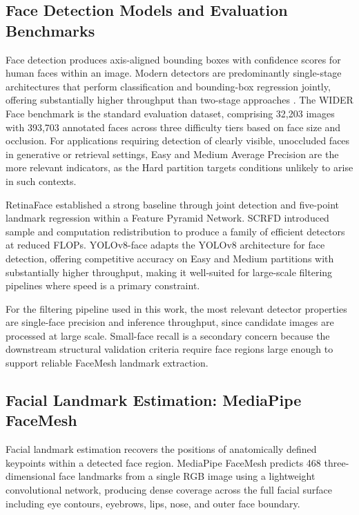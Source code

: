 \subsection{Face Detection Models and Evaluation Benchmarks}
\label{subsec:face_detection}

Face detection produces axis-aligned bounding boxes with confidence scores for human faces
within an image. Modern detectors are predominantly single-stage architectures that perform classification
and bounding-box regression jointly, offering substantially higher throughput than
two-stage approaches \cite{Deng_2020_RetinaFace}. The WIDER Face benchmark
\cite{Yang_2016_WIDERFace} is the standard evaluation dataset, comprising 32,203 images
with 393,703 annotated faces across three difficulty tiers based on face size and
occlusion. For applications requiring detection of clearly visible, unoccluded faces in
generative or retrieval settings, Easy and Medium Average Precision are the more relevant
indicators, as the Hard partition targets conditions unlikely to arise in such contexts.

RetinaFace \cite{Deng_2020_RetinaFace} established a strong baseline through joint
detection and five-point landmark regression within a Feature Pyramid Network. SCRFD
\cite{Guo_2021_SCRFD} introduced sample and computation redistribution to produce a family
of efficient detectors at reduced FLOPs. YOLOv8-face adapts the YOLOv8 architecture
\cite{Jocher_2023_YOLOv8} for face detection, offering competitive accuracy on Easy and
Medium partitions with substantially higher throughput, making it well-suited for
large-scale filtering pipelines where speed is a primary constraint.

For the filtering pipeline used in this work, the most relevant detector properties are
single-face precision and inference throughput, since candidate images are processed at
large scale. Small-face recall is a secondary concern because the downstream structural
validation criteria require face regions large enough to support reliable FaceMesh landmark
extraction.

\subsection{Facial Landmark Estimation: MediaPipe FaceMesh}
\label{subsec:facemesh}

Facial landmark estimation recovers the positions of anatomically defined keypoints within
a detected face region. MediaPipe FaceMesh \cite{Kartynnik_2019_FaceMesh} predicts 468
three-dimensional face landmarks from a single RGB image using a lightweight convolutional
network, producing dense coverage across the full facial surface including eye contours,
eyebrows, lips, nose, and outer face boundary.

